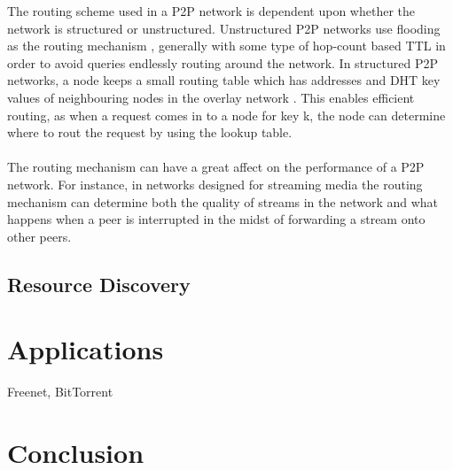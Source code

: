 \documentclass[12pt,letterpaper]{article}
\begin{document}
The routing scheme used in a P2P network is dependent upon whether the network is structured or unstructured.
Unstructured P2P networks use flooding as the routing mechanism \cite{overlay}, generally with some type of hop-count based TTL in order to avoid queries endlessly routing around the network.
In structured P2P networks, a node keeps a small routing table which has addresses and DHT key values of neighbouring nodes in the overlay network \cite{overlay}.
This enables efficient routing, as when a request comes in to a node for key k, the node can determine where to rout the request by using the lookup table.

\paragraph{}

The routing mechanism can have a great affect on the performance of a P2P network.
For instance, in networks designed for streaming media \cite{streaming} the routing mechanism can determine both the quality of streams in the network and what happens when a peer is interrupted in the midst of forwarding a stream onto other peers.

\subsection{Resource Discovery}

\section{Applications}

Freenet, BitTorrent

\section{Conclusion}



\end{document}
